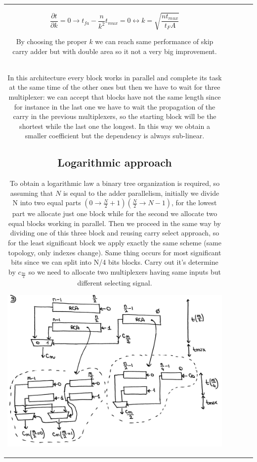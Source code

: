 \begin{center}
\begin{tabular}{|c|c|c|c|c|}
$$ \frac{\partial t}{\partial k} = 0 \longrightarrow  t_{fa}- \frac{n}{k^2} t_{mux}=0 \longleftrightarrow k=\sqrt{\frac{nt_{mux}}{t_FA}} $$

By choosing the proper $k$ we can reach same performance of skip carry adder but with double area so it not a very big improvement.\\

In this architecture every block works in parallel and complete its task at the same time of the other ones but then we have to wait for three multiplexer: we can accept that blocks have not the same length since for instance in the last one we have to wait the propagation of the carry in the previous multiplexers, so the starting block will be the shortest while the last one the longest. In this way we obtain a smaller coefficient but the dependency is always sub-linear.

\subsection{Logarithmic approach}
To obtain a logarithmic law a binary tree organization is required, so assuming that $N$ is equal to the adder parallelism, initially we divide N into two equal parts $(0 \rightarrow \frac{N}{2}+1) (\frac{N}{2} \rightarrow N-1)$, for the lowest part we allocate just one block while for the second we allocate two equal blocks working in parallel. Then we proceed in the same way by dividing one of this three block and reusing carry select approach, so for the least significant block we apply exactly the same scheme (same topology, only indexes change). Same thing occurs for most significant bits since we can split into N/4 bits blocks. Carry out it's determine by $c_{\frac{3n}{4}}$ so we need to allocate two multiplexers having same inputs but different selecting signal.

\begin{center}
  \includegraphics[width=0.7\linewidth]{img/img2/9}
\end{center}



\end{tabular}
\end{center}

